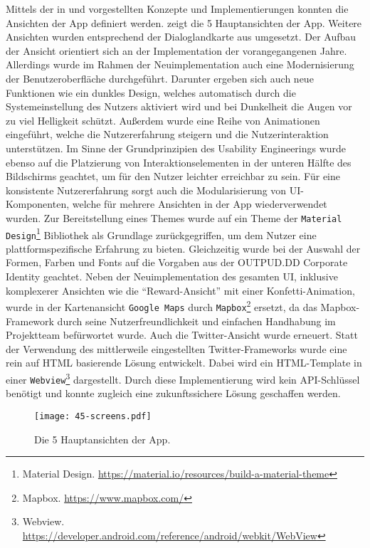 Mittels der in  und  vorgestellten Konzepte und Implementierungen konnten die Ansichten der App definiert werden.  zeigt die 5 Hauptansichten der App. Weitere Ansichten wurden entsprechend der Dialoglandkarte aus  umgesetzt. Der Aufbau der Ansicht orientiert sich an der Implementation der vorangegangenen Jahre. Allerdings wurde im Rahmen der Neuimplementation auch eine Modernisierung der Benutzeroberfläche durchgeführt. Darunter ergeben sich auch neue Funktionen wie ein dunkles Design, welches automatisch durch die Systemeinstellung des Nutzers aktiviert wird und bei Dunkelheit die Augen vor zu viel Helligkeit schützt. Außerdem wurde eine Reihe von Animationen eingeführt, welche die Nutzererfahrung steigern und die Nutzerinteraktion unterstützen. Im Sinne der Grundprinzipien des Usability Engineerings wurde ebenso auf die Platzierung von Interaktionselementen in der unteren Hälfte des Bildschirms geachtet, um für den Nutzer leichter erreichbar zu sein. Für eine konsistente Nutzererfahrung sorgt auch die Modularisierung von UI-Komponenten, welche für mehrere Ansichten in der App wiederverwendet wurden. Zur Bereitstellung eines Themes wurde auf ein Theme der \texttt{Material Design}\footnote{Material Design. \url{https://material.io/resources/build-a-material-theme}} Bibliothek als Grundlage zurückgegriffen, um dem Nutzer eine plattformspezifische Erfahrung zu bieten. Gleichzeitig wurde bei der Auswahl der Formen, Farben und Fonts auf die Vorgaben aus der OUTPUD.DD Corporate Identity geachtet. Neben der Neuimplementation des gesamten UI, inklusive komplexerer Ansichten wie die \enquote{Reward-Ansicht} mit einer Konfetti-Animation, wurde in der Kartenansicht \texttt{Google Maps} durch \texttt{Mapbox}\footnote{Mapbox. \url{https://www.mapbox.com/}} ersetzt, da das Mapbox-Framework durch seine Nutzerfreundlichkeit und einfachen Handhabung im Projektteam befürwortet wurde. Auch die Twitter-Ansicht wurde erneuert. Statt der Verwendung des mittlerweile eingestellten Twitter-Frameworks wurde eine rein auf HTML basierende Lösung entwickelt. Dabei wird ein HTML-Template in einer \texttt{Webview}\footnote{Webview. \url{https://developer.android.com/reference/android/webkit/WebView}} dargestellt. Durch diese Implementierung wird kein API-Schlüssel benötigt und konnte zugleich eine zukunftssichere Lösung geschaffen werden.

\begin{figure}[H]
    \texttt{[image: 45-screens.pdf]}
    \caption{Die 5 Hauptansichten der App.}\label{fig:screens}
\end{figure}

